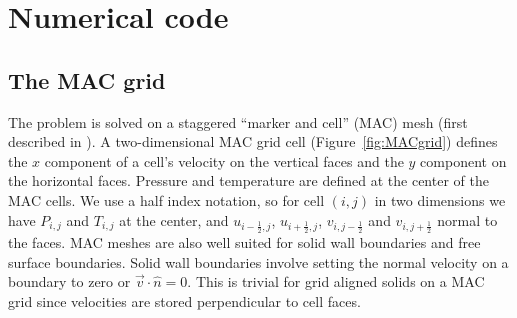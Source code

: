 \documentclass[a4paper,10pt]{scrartcl}
\begin{document}
\section{Numerical code}
\subsection{The MAC grid \label{sec:MACgrid}}
The problem is solved on a staggered ``marker and cell'' (MAC) mesh (first described in \cite{harlow1965numerical}). A two-dimensional MAC grid cell (Figure~\ref{fig:MACgrid}) defines the $x$ component of a cell's velocity on the vertical faces and the $y$ component on the horizontal faces. Pressure and temperature are defined at the center of the MAC cells. We use a half index notation, so for cell $(i,j)$ in two dimensions we have $P_{i,j}$ and $T_{i,j}$ at the center, and $u_{i-\frac{1}{2},j}$, $u_{i+\frac{1}{2},j}$, $v_{i,j-\frac{1}{2}}$ and $v_{i,j+\frac{1}{2}}$ normal to the faces. MAC meshes are also well suited for solid wall boundaries and free surface boundaries. Solid wall boundaries involve setting the normal velocity on a boundary to zero or $\vec{v}\cdot\hat{n} = 0$. This is trivial for grid aligned solids on a MAC grid since velocities are stored perpendicular to cell faces.
\end{document}
